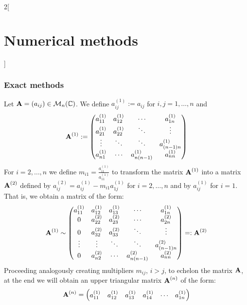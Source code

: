 \documentclass[../../../main.tex]{subfiles}
\begin{document}
\begin{multicols}{2}[\section{Numerical methods}]
    \subsubsection*{Exact methods}
    \begin{method}
        Let $\vectorfunction{A}=(a_{ij})\in\mathcal{M}_n(\CC)$. We define $a_{ij}^{(1)}:=a_{ij}$ for $i,j=1,\ldots,n$ and
        $$\vectorfunction{A}^{(1)}:=
            \begin{pmatrix}
                a_{11}^{(1)} & a_{12}^{(1)} & \cdots           & a_{1n}^{(1)}     \\
                a_{21}^{(1)} & a_{22}^{(1)} & \ddots           & \vdots           \\
                \vdots       & \ddots       & \ddots           & a_{(n-1)n}^{(1)} \\
                a_{n1}^{(1)} & \cdots       & a_{n(n-1)}^{(1)} & a_{nn}^{(1)}
            \end{pmatrix}
        $$
        For $i=2,\ldots,n$ we define $m_{i1}=\frac{a_{i1}^{(1)}}{a_{11}^{(1)}}$ to transform the matrix $\vectorfunction{A}^{(1)}$ into a matrix $\vectorfunction{A}^{(2)}$ defined by $a_{ij}^{(2)}=a_{ij}^{(1)}-m_{i1}a_{1j}^{(1)}$ for $i=2,\ldots,n$ and by $a_{ij}^{(1)}$ for $i=1$. That is, we obtain a matrix of the form:
        $$\vectorfunction{A}^{(1)}\sim
            \begin{pmatrix}
                a_{11}^{(1)} & a_{12}^{(1)} & a_{13}^{(1)} & \cdots           & a_{1n}^{(1)}     \\
                0            & a_{22}^{(2)} & a_{23}^{(2)} & \cdots           & a_{2n}^{(2)}     \\
                0            & a_{32}^{(2)} & a_{33}^{(2)} & \ddots           & \vdots           \\
                \vdots       & \vdots       & \ddots       & \ddots           & a_{(n-1)n}^{(2)} \\
                0            & a_{n2}^{(2)} & \cdots       & a_{n(n-1)}^{(2)} & a_{nn}^{(2)}
            \end{pmatrix} =:\vectorfunction{A}^{(2)}
        $$
        Proceeding analogously creating multipliers $m_{ij}$, $i>j$, to echelon the matrix $\vectorfunction{A}$, at the end we will obtain an upper triangular matrix $\vectorfunction{A}^{(n)}$ of the form:
        $$\vectorfunction{A}^{(n)}=
            \begin{pmatrix}
                a_{11}^{(1)} & a_{12}^{(1)} & a_{13}^{(1)} & a_{14}^{(1)} & \cdots                 & a_{1n}^{(1)}       \\

\end{pmatrix}$$
\end{method}
\end{multicols}
\end{document}
